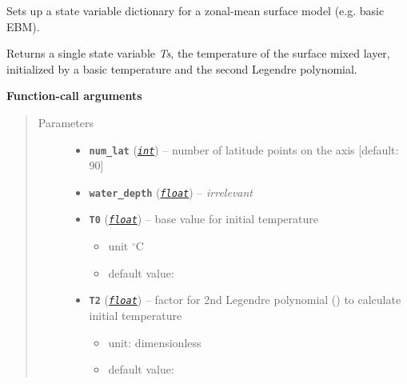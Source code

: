 \documentclass[a4paper,10pt,english]{sphinxmanual}
\begin{document}
\begin{fulllineitems}
\label{api/climlab.domain:climlab.domain.initial.surface_state}
Sets up a state variable dictionary for a zonal-mean surface model
(e.g. basic EBM).

Returns a single state variable \emph{Ts}, the temperature of the surface 
mixed layer, initialized by a basic temperature and the second Legendre
polynomial.

\textbf{Function-call arguments}
\begin{quote}\begin{description}
\item[{Parameters}] \leavevmode\begin{itemize}
\item {} 
\textbf{\texttt{num\_lat}} (\href{http://docs.python.org/2.7/library/functions.html\#int}{\emph{\texttt{int}}}) -- number of latitude points on the axis
{[}default: 90{]}

\item {} 
\textbf{\texttt{water\_depth}} (\href{http://docs.python.org/2.7/library/functions.html\#float}{\emph{\texttt{float}}}) -- \emph{irrelevant}

\item {} 
\textbf{\texttt{T0}} (\href{http://docs.python.org/2.7/library/functions.html\#float}{\emph{\texttt{float}}}) -- 
base value for initial temperature
\begin{itemize}
\item {} 
unit \(^{\circ} \textrm{C}\)

\item {} 
default value: 

\end{itemize}


\item {} 
\textbf{\texttt{T2}} (\href{http://docs.python.org/2.7/library/functions.html\#float}{\emph{\texttt{float}}}) -- 
factor for 2nd Legendre polynomial 
{\hyperref[api/climlab.utils:climlab.utils.legendre.P2]{\emph{}}} () 
to calculate initial temperature
\begin{itemize}
\item {} 
unit: dimensionless

\item {} 
default value: 


\end{itemize}
\end{itemize}
\end{description}
\end{quote}
\end{fulllineitems}
\end{document}
